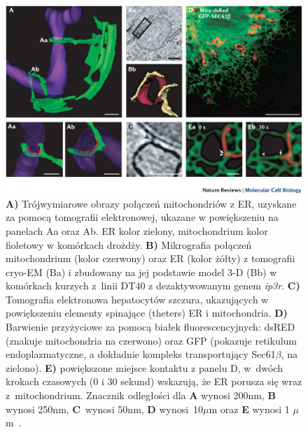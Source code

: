 \begin{figure}[ht]
  \centering
  \includegraphics[width=1\textwidth]{rysunki/rozdzial_1/MAM_picture2}
  \caption[MAM - mikrografia z tomografii elektronowej]{\textbf{A)} Trójwymiarowe obrazy połączeń mitochondriów z ER, uzyskane za pomocą tomografii elektronowej, ukazane w powiększeniu na panelach Aa oraz Ab. ER kolor zielony, mitochondrium kolor fioletowy w komórkach drożdży. \textbf{B)} Mikrografia połączeń mitochondrium (kolor czerwony) oraz ER (kolor żółty) z tomografii cryo-EM (Ba) i zbudowany na jej podstawie model 3-D (Bb) w komórkach kurzych z~linii DT40 z dezaktywowanym genem \textit{ip3r}. \textbf{C)} Tomografia elektronowa hepatocytów szczura, ukazujących w powiększeniu elementy spinające (theters) ER i mitochondria. \textbf{D)} Barwienie przyżyciowe za pomocą białek fluorescencyjnych: dsRED (znakuje mitochondria na czerwono) oraz GFP (pokazuje retikulum endoplazmatyczne, a dokładnie kompleks transportujący Sec61$\beta$, na zielono). \textbf{E)} powiększone miejsce kontaktu z panelu D, w~dwóch krokach czasowych (0 i 30 sekund) wskazują, że ER porusza się wraz z~mitochondrium. Znacznik odległości dla \textbf{A} wynosi 200nm, \textbf{B} wynosi 250nm, \textbf{C}~wynosi 50nm, \textbf{D} wynosi~10$\mu$m oraz \textbf{E} wynosi 1 $\mu$m~\cite{Rowland2012}.}
  \label{fig:MAMfoto2}
\end{figure}

